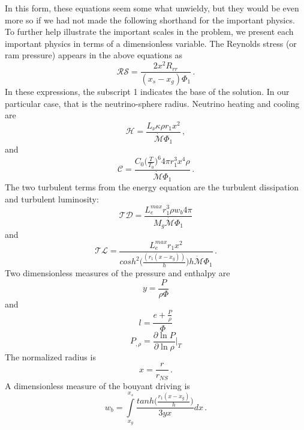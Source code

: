 \documentclass[twocolumn]{aastex6}
\begin{document}
In this form, these equations seem some what unwieldy, but
  they would be even more so if we had not made the following
  shorthand for the important physics.  To further help illustrate the
important scales in the problem, we present each important physics in
terms of a dimensionless variable.
The Reynolds stress (or ram pressure) appears in the above
  equations as
\begin{equation}
\mathcal{RS} = \frac{2x^2R_{rr}}{(x_s-x_g)\Phi_1} \, .
\end{equation}
In these expressions, the subscript 1 indicates the base of the
solution.  In our particular case, that is the neutrino-sphere
radius.  Neutrino heating and cooling are
\begin{equation}
\mathcal{H} = \frac{L_\nu \kappa \rho r_1 x^2}{\dot{\mathcal{M}}
  \Phi_1}  \, ,
\end{equation}
and
\begin{equation}
\mathcal{C} = \frac{C_0 \big( \frac{T}{T_0} \big )^6 4 \pi r_1^3 x^4
  \rho}{\dot{\mathcal{M}} \Phi_1} \, .
\end{equation}
The two turbulent terms from the energy equation are the
  turbulent dissipation and turbulent luminosity:
\begin{equation}
\mathcal{TD} = \frac{L_e^{max} r_1^3 \rho w_b 4 \pi}{M_g \dot{\mathcal{M}} \Phi_1}
\end{equation}
and
\begin{equation}
\mathcal{TL} = \frac{L_e^{max} r_1 x^2}{cosh ^2 \big( \frac{(r_1(x -
    x_g))}{h} \big) h \dot{\mathcal{M}} \Phi_1} \, .
\end{equation}
Two dimensionless measures of the pressure and enthalpy are
\begin{equation}
  y = \frac{P}{\rho \Phi}
\end{equation}
and
\begin{equation}
  l = \frac{e + \frac{P}{\rho}}{\Phi}
\end{equation}
\begin{equation}
  P_{,\rho} = \frac{\partial \ln P}{\partial \ln \rho} \bigg |_T
\end{equation}
The normalized radius is
\begin{equation}
  x = \frac{r}{r_{NS}} \, .
\end{equation}
A dimensionless measure of the bouyant driving is
\begin{equation}
  w_b = \int\limits_{x_g}^{x_s} \frac{tanh \big( \frac{r_1(x -
      x_g)}{h} \big)}{3yx} dx \, .
  \label{endofeq}
\end{equation}
\end{document}
